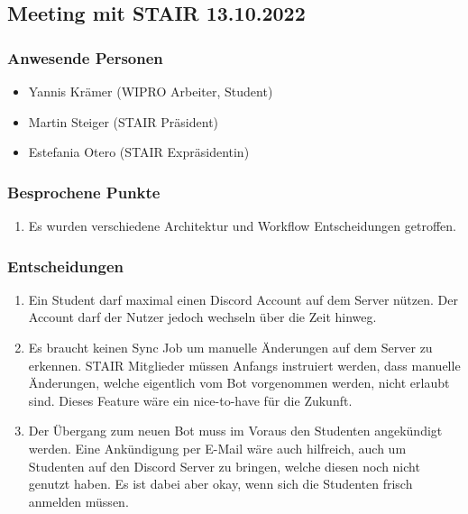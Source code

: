 \documentclass[a4paper, table]{article}
\begin{document}
\newpage
\subsection{Meeting mit STAIR 13.10.2022}

\subsubsection*{Anwesende Personen}

\begin{itemize}
    \item Yannis Krämer (WIPRO Arbeiter, Student)
    \item Martin Steiger (STAIR Präsident)
    \item Estefania Otero (STAIR Expräsidentin)
\end{itemize}

\subsubsection*{Besprochene Punkte}

\begin{enumerate}
    \item Es wurden verschiedene Architektur und Workflow Entscheidungen getroffen.
\end{enumerate}

\subsubsection*{Entscheidungen}

\begin{enumerate}
    \item Ein Student darf maximal einen Discord Account auf dem Server nützen. Der Account darf der Nutzer jedoch wechseln über die Zeit hinweg.
    \item Es braucht keinen Sync Job um manuelle Änderungen auf dem Server zu erkennen. STAIR Mitglieder müssen Anfangs instruiert werden, dass manuelle Änderungen, welche eigentlich vom Bot vorgenommen werden, nicht erlaubt sind. Dieses Feature wäre ein nice-to-have für die Zukunft.
    \item Der Übergang zum neuen Bot muss im Voraus den Studenten angekündigt werden. Eine Ankündigung per E-Mail wäre auch hilfreich, auch um Studenten auf den Discord Server zu bringen, welche diesen noch nicht genutzt haben. Es ist dabei aber okay, wenn sich die Studenten frisch anmelden müssen.
\end{enumerate}
\end{document}
